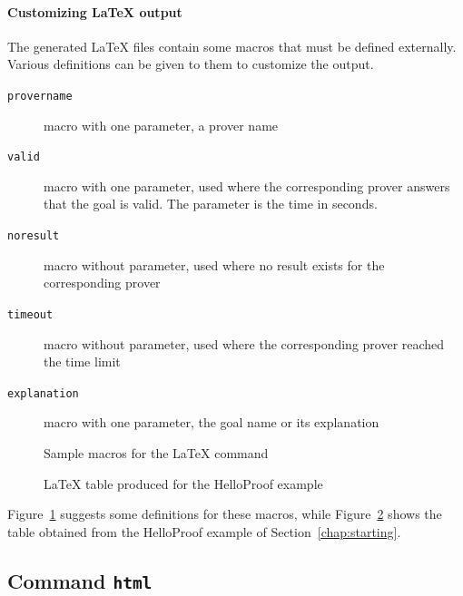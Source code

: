 \paragraph{Customizing LaTeX output}

The generated LaTeX files contain some macros that must be defined
externally.  Various definitions can be given to them to customize the
output.
\begin{description}
\item[\texttt{\bs{}provername}] macro with one parameter, a prover name
\item[\texttt{\bs{}valid}] macro with one parameter, used where the corresponding prover answers that the goal is valid. The parameter is the time in seconds.
\item[\texttt{\bs{}noresult}] macro without parameter, used where no result
  exists for the corresponding prover
\item[\texttt{\bs{}timeout}] macro without parameter, used where the corresponding prover reached the time limit
\item[\texttt{\bs{}explanation}] macro with one parameter, the goal name or its explanation
\end{description}

\begin{figure}[t]
\begin{center}

\end{center}
\caption{Sample macros for the LaTeX command}
\label{fig:custom-latex}
\end{figure}

\begin{figure}[t]
\begin{center}
\begin{toimage}

\end{toimage}
\end{center}
\caption{LaTeX table produced for the HelloProof example}
\label{fig:latex}
\end{figure}

Figure~\ref{fig:custom-latex} suggests some definitions for these macros,
while Figure~\ref{fig:latex} shows the table obtained from the HelloProof
example of Section~\ref{chap:starting}.

\subsection{Command \texttt{html}}

